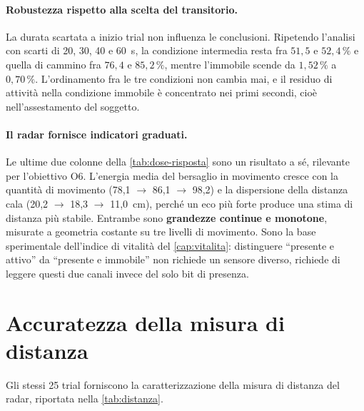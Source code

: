 \paragraph{Robustezza rispetto alla scelta del transitorio.} La durata scartata a
inizio trial non influenza le conclusioni. Ripetendo l'analisi con scarti di 20, 30,
40 e 60~s, la condizione intermedia resta fra $51{,}5$ e $52{,}4\,\%$ e quella di
cammino fra $76{,}4$ e $85{,}2\,\%$, mentre l'immobile scende da $1{,}52\,\%$ a
$0{,}70\,\%$. L'ordinamento fra le tre condizioni non cambia mai, e il residuo di
attività nella condizione immobile è concentrato nei primi secondi, cioè
nell'assestamento del soggetto.

\paragraph{Il radar fornisce indicatori graduati.} Le ultime due colonne della
\cref{tab:dose-risposta} sono un risultato a sé, rilevante per l'obiettivo O6.
L'energia media del bersaglio in movimento cresce con la quantità di movimento
(78,1 $\to$ 86,1 $\to$ 98,2) e la dispersione della distanza cala
(20,2 $\to$ 18,3 $\to$ 11,0~cm), perché un eco più forte produce una stima di distanza
più stabile. Entrambe sono \textbf{grandezze continue e monotone}, misurate a
geometria costante su tre livelli di movimento. Sono la base sperimentale dell'indice
di vitalità del \cref{cap:vitalita}: distinguere ``presente e attivo'' da ``presente e
immobile'' non richiede un sensore diverso, richiede di leggere questi due canali
invece del solo bit di presenza.

\section{Accuratezza della misura di distanza}
\label{sec:distanza}

Gli stessi 25 trial forniscono la caratterizzazione della misura di distanza del
radar, riportata nella \cref{tab:distanza}.


